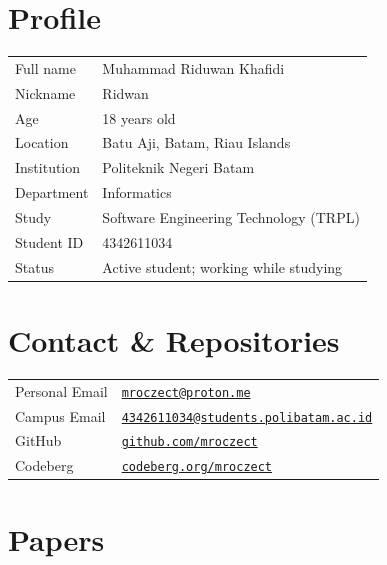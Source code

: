 \section*{Profile}

\noindent
\begin{tabularx}{\textwidth}{@{} l X @{}}
	\toprule
	Full name   & Muhammad Riduwan Khafidi               \\
	Nickname    & Ridwan                                 \\
	Age         & 18 years old                           \\
	Location    & Batu Aji, Batam, Riau Islands          \\
	Institution & Politeknik Negeri Batam                \\
	Department  & Informatics                            \\
	Study       & Software Engineering Technology (TRPL) \\
	Student ID  & 4342611034                             \\
	Status      & Active student; working while studying \\
	\bottomrule
\end{tabularx}

\section*{Contact \& Repositories}

\noindent
\begin{tabularx}{\textwidth}{@{} l X @{}}
	\toprule
	Personal Email & \href{mailto:mroczect@proton.me}{\nolinkurl{mroczect@proton.me}}                                   \\
	Campus Email   & \href{mailto:4342611034@students.polibatam.ac.id}{\nolinkurl{4342611034@students.polibatam.ac.id}} \\
	GitHub         & \href{https://github.com/mroczect}{\nolinkurl{github.com/mroczect}}                                \\
	Codeberg       & \href{https://codeberg.org/mroczect}{\nolinkurl{codeberg.org/mroczect}}                            \\
	\bottomrule
\end{tabularx}

\section*{Papers}

